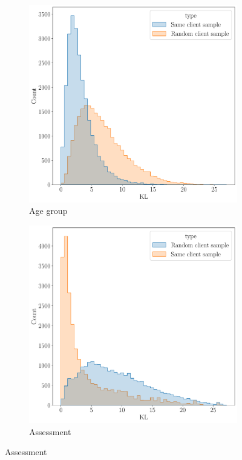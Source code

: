 \documentclass[sigconf]{acmart}
\begin{document}
\begin{figure}
  \centering
  \begin{subfigure}{0.25\linewidth}
    \caption{Age group}
    \includegraphics[width=\linewidth]{figures/kl_dis_age_group.pdf}
  \end{subfigure}%
  \begin{subfigure}{0.25\linewidth}
    \caption{Assessment}
    \includegraphics[width=\linewidth]{figures/kl_dis_assessment.pdf}

\end{subfigure}
\end{figure}
\end{document}
